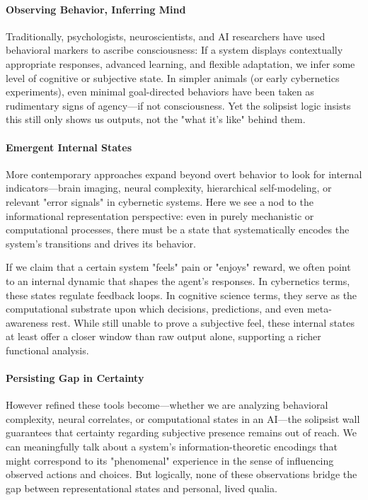 \documentclass[12pt,letterpaper]{article}
\begin{document}
\paragraph{Observing Behavior, Inferring Mind}

Traditionally, psychologists, neuroscientists, and AI researchers have used behavioral markers to ascribe consciousness: If a system displays contextually appropriate responses, advanced learning, and flexible adaptation, we infer some level of cognitive or subjective state. In simpler animals (or early cybernetics experiments), even minimal goal-directed behaviors have been taken as rudimentary signs of agency---if not consciousness. Yet the solipsist logic insists this still only shows us outputs, not the "what it's like" behind them.

\paragraph{Emergent Internal States}

More contemporary approaches expand beyond overt behavior to look for internal indicators---brain imaging, neural complexity, hierarchical self-modeling, or relevant "error signals" in cybernetic systems. Here we see a nod to the informational representation perspective: even in purely mechanistic or computational processes, there must be a state that systematically encodes the system's transitions and drives its behavior.

If we claim that a certain system "feels" pain or "enjoys" reward, we often point to an internal dynamic that shapes the agent's responses. In cybernetics terms, these states regulate feedback loops. In cognitive science terms, they serve as the computational substrate upon which decisions, predictions, and even meta-awareness rest. While still unable to prove a subjective feel, these internal states at least offer a closer window than raw output alone, supporting a richer functional analysis.

\paragraph{Persisting Gap in Certainty}

However refined these tools become---whether we are analyzing behavioral complexity, neural correlates, or computational states in an AI---the solipsist wall guarantees that certainty regarding subjective presence remains out of reach. We can meaningfully talk about a system's information-theoretic encodings that might correspond to its "phenomenal" experience in the sense of influencing observed actions and choices. But logically, none of these observations bridge the gap between representational states and personal, lived qualia.
\end{document}
